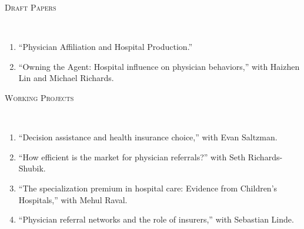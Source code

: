 \documentclass[9pt]{article}
\newenvironment{changemargin}[2]{%
  \begin{list}{}{%
    \setlength{\topsep}{0pt}%
    \setlength{\leftmargin}{#1}%
    \setlength{\rightmargin}{#2}%
    \setlength{\listparindent}{\parindent}%
    \setlength{\itemindent}{\parindent}%
    \setlength{\parsep}{\parskip}%
  }%
  \item[]}{\end{list}
}
\newcommand{\lineover}{
	\begin{changemargin}{-0.05in}{-0.05in}
		\vspace*{-8pt}
		\hrulefill \\
		\vspace*{-2pt}
	\end{changemargin}
}
\newcommand{\header}[1]{
	\begin{changemargin}{-0.5in}{-0.5in}
		\scshape{#1}\\
  	\lineover
	\end{changemargin}
}
\newenvironment{body} {
	\vspace*{-16pt}
	\begin{changemargin}{-0.25in}{-0.5in}
  }	
	{\end{changemargin}
}
\begin{document}
\header{Draft Papers}
\begin{body}
  \vspace{14pt}
  \begin{enumerate}
    \item ``Physician Affiliation and Hospital Production.''
    \item ``Owning the Agent: Hospital influence on physician behaviors,'' with Haizhen Lin and Michael Richards.
  \end{enumerate}
\end{body}
\smallskip

\header{Working Projects}
\begin{body}
  \vspace{14pt}
  \begin{enumerate}
    \item ``Decision assistance and health insurance choice,'' with Evan Saltzman.
    \item ``How efficient is the market for physician referrals?'' with Seth Richards-Shubik.
    \item ``The specialization premium in hospital care: Evidence from Children's Hospitals,'' with Mehul Raval.
    \item ``Physician referral networks and the role of insurers,'' with Sebastian Linde.
  \end{enumerate}
\end{body}
\smallskip
\end{document}
